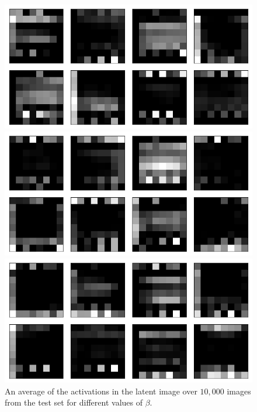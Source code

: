 \begin{figure}[h!]
\centering
\captionsetup{justification=centering}

    \includegraphics[scale=0.42]{figures/results/weighted_average/beta_1_average_activation.png}
    \caption{$\beta=1$}
    \includegraphics[scale=0.42]{figures/results/weighted_average/beta_2_average_activation.png}
    \caption{$\beta=2$}
    \includegraphics[scale=0.42]{figures/results/weighted_average/beta_4_average_activation.png}
    \caption{$\beta=4$}

\caption{An average of the activations in the latent image over $10,000$ images from the test set for different values of $\beta$.}
\label{fig:weighted_average_originals_posterior_samples}
\end{figure}



